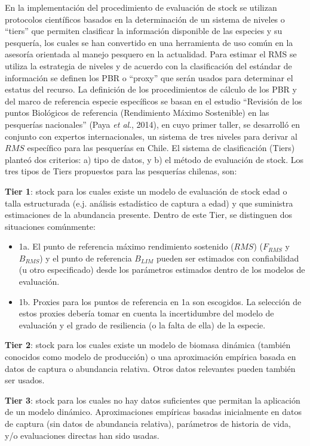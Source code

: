 \documentclass[
  spanish,
]{article}
\begin{document}
En la implementación del procedimiento de evaluación de stock se
utilizan protocolos científicos basados en la determinación de un
sistema de niveles o ``tiers'' que permiten clasificar la información
disponible de las especies y su pesquería, los cuales se han convertido
en una herramienta de uso común en la asesoría orientada al manejo
pesquero en la actualidad. Para estimar el RMS se utiliza la estrategia
de niveles y de acuerdo con la clasificación del estándar de información
se definen los PBR o ``proxy'' que serán usados para determinar el
estatus del recurso. La definición de los procedimientos de cálculo de
los PBR y del marco de referencia especie específicos se basan en el
estudio ``Revisión de los puntos Biológicos de referencia (Rendimiento
Máximo Sostenible) en las pesquerías nacionales'' (Paya \emph{et al}.,
2014), en cuyo primer taller, se desarrolló en conjunto con expertos
internacionales, un sistema de tres niveles para derivar al \(RMS\)
específico para las pesquerías en Chile. El sistema de clasificación
(Tiers) planteó dos criterios: a) tipo de datos, y b) el método de
evaluación de stock. Los tres tipos de Tiers propuestos para las
pesquerías chilenas, son:

\textbf{Tier 1}: stock para los cuales existe un modelo de evaluación de
stock edad o talla estructurada (e.j. análisis estadístico de captura a
edad) y que suministra estimaciones de la abundancia presente. Dentro de
este Tier, se distinguen dos situaciones comúnmente:

\begin{itemize}
\item
  1a. El punto de referencia máximo rendimiento sostenido (\(RMS\))
  (\(F_{RMS}\) y \(B_{RMS}\)) y el punto de referencia \(B_{LIM}\)
  pueden ser estimados con confiabilidad (u otro especificado) desde los
  parámetros estimados dentro de los modelos de evaluación.
\item
  1b. Proxies para los puntos de referencia en 1a son escogidos. La
  selección de estos proxies debería tomar en cuenta la incertidumbre
  del modelo de evaluación y el grado de resiliencia (o la falta de
  ella) de la especie.
\end{itemize}

\textbf{Tier 2}: stock para los cuales existe un modelo de biomasa
dinámica (también conocidos como modelo de producción) o una
aproximación empírica basada en datos de captura o abundancia relativa.
Otros datos relevantes pueden también ser usados.

\textbf{Tier 3}: stock para los cuales no hay datos suficientes que
permitan la aplicación de un modelo dinámico. Aproximaciones empíricas
basadas inicialmente en datos de captura (sin datos de abundancia
relativa), parámetros de historia de vida, y/o evaluaciones directas han
sido usadas.
\end{document}
